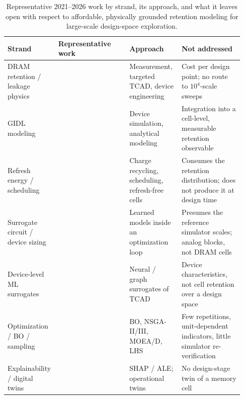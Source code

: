 \documentclass[11pt,a4paper]{article}
\begin{document}
\begin{table}[!ht]
\centering
\caption{Representative 2021--2026 work by strand, its approach, and what it
leaves open with respect to affordable, physically grounded retention modeling
for large-scale design-space exploration.}
\label{tab:lit}
\footnotesize
\begin{tabular}{@{}p{0.15\linewidth}p{0.30\linewidth}p{0.22\linewidth}p{0.26\linewidth}@{}}
\toprule
\textbf{Strand} & \textbf{Representative work} & \textbf{Approach} &
\textbf{Not addressed} \\
\midrule
DRAM retention / leakage physics &
\cite{kim2021rdf,kim2021trap,bepary2022aging,park2025capleak,kong2025twoT,kong2026threeT} &
Measurement, targeted TCAD, device engineering &
Cost per design point; no route to $10^{4}$-scale sweeps \\
\addlinespace
GIDL modeling &
\cite{maniyar2022sidewall,lee2022stress,thakur2023gidl,bashir2024btbt,kwak2024gidl,nano2026gidl} &
Device simulation, analytical modeling &
Integration into a cell-level, measurable retention observable \\
\addlinespace
Refresh energy / scheduling &
\cite{du2025crdram,golman2021refresh,nguyen2021zem,gupta2021tfet,ted2026refresh,tcad2026refresh} &
Charge recycling, scheduling, refresh-free cells &
Consumes the retention distribution; does not produce it at design time \\
\addlinespace
Surrogate circuit / device sizing &
\cite{budak2022sizing,rashid2024global,yin2023surrogate,tang2024cnn,vlsi2026transformer,tcad2026multitask} &
Learned models inside an optimization loop &
Presumes the reference simulator scales; analog blocks, not DRAM cells \\
\addlinespace
Device-level ML surrogates &
\cite{jang2023gnn,wang2023tcadcal,akbar2022devsim,guo2023pinn,liu2025sann,li2025devmodel} &
Neural / graph surrogates of TCAD &
Device characteristics, not cell retention over a design space \\
\addlinespace
Optimization / BO / sampling &
\cite{zhang2022batchbo,touloupas2022locomobo,chen2022highdimbo,saglican2023moead,borisut2023alhs,phromphan2024lhs} &
BO, NSGA-II/III, MOEA/D, LHS &
Few repetitions, unit-dependent indicators, little simulator re-verification \\
\addlinespace
Explainability / digital twins &
\cite{homafar2022shap,abdollahi2024xai,lundberg2017shap,apley2020ale,ruhe2023dtwin,massaro2025dtwin} &
SHAP / ALE; operational twins &
No design-stage twin of a memory cell \\
\bottomrule
\end{tabular}
\end{table}
\end{document}
